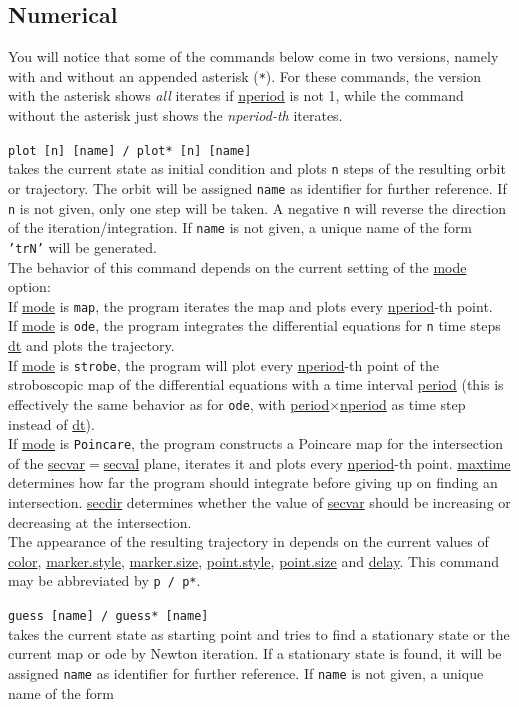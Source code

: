 \documentclass[10pt,a4paper,titlepage]{article}
\newcommand{\cmd}[2]{\item{\T{\hypertarget{#1}{#1}\index[index]{#1} #2}}}
\newcommand{\HL}[1]{\hyperlink{#1}{#1}}
\newcommand{\T}[1]{\texttt{#1}}
\begin{document}
\subsection{Numerical}
You will notice that some of the commands below come in two versions, namely with and without an appended asterisk (\T{*}). For these commands, the version with the asterisk shows \emph{all} iterates if \HL{nperiod} is not 1, while the command without the asterisk just shows the \emph{nperiod-th} iterates. 
\begin{description}
\cmd{plot}{[n] [name] / plot* [n] [name]}\\takes the current state as initial condition and plots \T{n} steps of the resulting orbit or trajectory. The orbit will be assigned \T{name} as identifier for further reference. If \T{n} is not given, only one step will be taken. A negative \T{n} will reverse the direction of the iteration/integration. If \T{name} is not given, a unique name of the form \T{'trN'} will be generated.\\
The behavior of this command depends on the current setting of the \HL{mode} option:\\
If \HL{mode} is \T{map}, the program iterates the map and plots every \HL{nperiod}-th point.\\
If \HL{mode} is \T{ode}, the program integrates the differential equations for \T{n} time steps \HL{dt} and plots the trajectory.\\
If \HL{mode} is \T{strobe}, 
the program will plot every \HL{nperiod}-th point of the stroboscopic map of the differential equations with a time interval \HL{period} (this is effectively the same behavior as for \T{ode}, with \HL{period}$\times$\HL{nperiod} as time step instead of \HL{dt}).\\
If \HL{mode} is \T{Poincare}, the program constructs a Poincare map for the intersection of the \HL{secvar}$=$\HL{secval} plane, iterates it and plots every \HL{nperiod}-th point. \HL{maxtime} determines how far the program should integrate before giving up on finding an intersection. \HL{secdir} determines whether the value of \HL{secvar} should be increasing or decreasing at the intersection.\\ 
The appearance of the resulting trajectory in depends on the current values of \HL{color}, \HL{marker.style}, \HL{marker.size}, \HL{point.style}, \HL{point.size} and \HL{delay}. This command may be abbreviated by \T{p / p*}.
\cmd{guess}{[name] / guess* [name]}\\takes the current state as starting point and tries to find a stationary state or the current map or ode by Newton iteration. If a stationary state is found, it will be assigned \T{name} as identifier for further reference. If \T{name} is not given, a unique name of the form 

\end{description}
\end{document}
